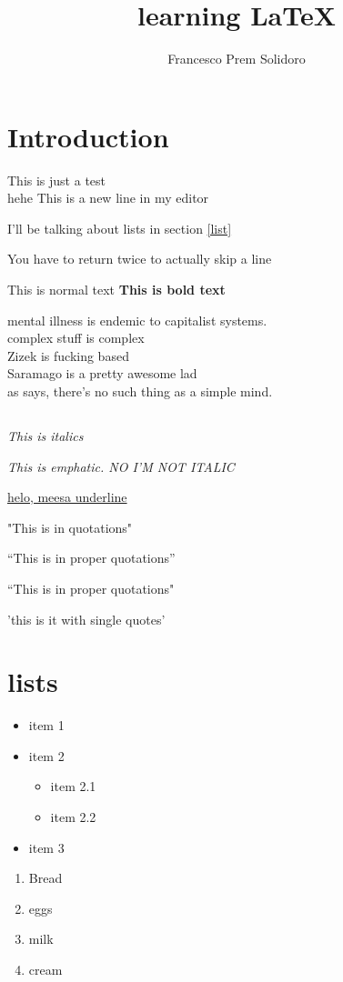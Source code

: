\documentclass[12pt]{article}
\author{Francesco Prem Solidoro}
\title{learning {\LaTeX}}
\begin{document}
\maketitle

\section{Introduction}
This is just a test \\ hehe
This is a new line in my editor

I'll be talking about lists in section \ref{list}

You have to return twice to actually skip a line

This is normal text \textbf {This is bold text}


mental illness is endemic to capitalist systems.\cite{Cap_Realism}\\
complex stuff is complex \cite{Complexity}\\
Zizek is fucking based \cite{Perverted_Guide_Global_politics}\\
Saramago is a pretty awesome lad \cite{Blindness_Saramago}\\
as \textcite{Complexity} says, there's no such thing as a simple mind.
\printbibliography

\subsection{}
\textit{This is italics}

\emph{This is emphatic. NO I'M NOT ITALIC}

\underline{helo, meesa underline}

"This is in quotations"


``This is in proper quotations''

``This is in proper quotations"

'this is it with single quotes'
\section{lists\label{list}}
\begin{itemize}
	\item item 1
	\item item 2
		\begin{itemize}
			\item item 2.1
			\item item 2.2
		\end{itemize}
	\item item 3
\end{itemize}
\begin{enumerate}
	\item Bread
	\item eggs
	\item milk
	\item cream
\end{enumerate}
\end{document}
